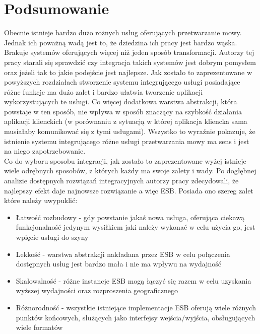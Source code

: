 
\chapter{Podsumowanie} %



\ifpdf
    \graphicspath{{7/figures/PNG/}{7/figures/PDF/}{7/figures/}}
\else
    \graphicspath{{7/figures/EPS/}{7/figures/}}
\fi

Obecnie istnieje bardzo dużo rożnych usług oferujących przetwarzanie mowy. Jednak ich poważną wadą jest to, że dziedzina ich pracy jest bardzo wąska. Brakuje systemów oferujących więcej niż jeden sposób transformacji. Autorzy tej pracy starali się sprawdzić czy integracja takich systemów jest dobrym pomysłem oraz jeżeli tak to jakie podejście jest najlepsze. Jak zostało to zaprezentowane w powyższych rozdziałach stworzenie systemu integrującego usługi posiadające różne funkcje ma dużo zalet i bardzo ułatwia tworzenie aplikacji wykorzystujących te usługi. Co więcej dodatkowa warstwa abstrakcji, która powstaje w ten sposób, nie wpływa w sposób znaczący na szybkość działania aplikacji klienckich (w porównaniu z sytuacją w której aplikacja kliencka sama musiałaby komunikować się z tymi usługami). Wszystko to wyraźnie pokazuje, że istnienie systemu integrującego różne usługi przetwarzania mowy ma sens i jest na niego zapotrzebowanie. \\
Co do wyboru sposobu integracji, jak zostało to zaprezentowane wyżej istnieje wiele odrębnych sposobów, z których każdy ma swoje zalety i wady. Po dogłębnej analizie dostępnych rozwiązań integracyjnych autorzy pracy zdecydowali, że najlepszy efekt daje najnowsze rozwiązanie a więc ESB. Posiada ono szereg zalet które należy uwypuklić:
\begin{itemize}
	\item Łatwość rozbudowy - gdy powstanie jakaś nowa usługa, oferująca ciekawą funkcjonalność jedynym wysiłkiem jaki należy wykonać w celu użycia go, jest wpięcie usługi do szyny
	\item Lekkość - warstwa abstrakcji nakładana przez ESB w celu połączenia dostępnych usług jest bardzo mała i nie ma wpływu na wydajność
	\item Skalowalność - różne instancje ESB mogą łączyć się razem w celu uzyskania wyższej wydajności oraz rozproszenia geograficznego
	\item Różnorodność - wszystkie istniejące implementacje ESB oferują wiele różnych punktów końcowych, służących jako interfejsy wejścia/wyjścia, obsługujących wiele formatów
\end{itemize}
